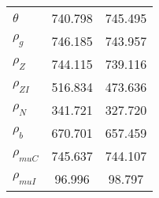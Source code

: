 \begin{center}
\begin{longtable}{lcc}
$ {\theta}             $	 & 	     740.798	 & 	     745.495 \\ 
$ {\rho_g}             $	 & 	     746.185	 & 	     743.957 \\ 
$ {\rho_Z}             $	 & 	     744.115	 & 	     739.116 \\ 
$ {\rho_{ZI}}          $	 & 	     516.834	 & 	     473.636 \\ 
$ {\rho_N}             $	 & 	     341.721	 & 	     327.720 \\ 
$ {\rho_b}             $	 & 	     670.701	 & 	     657.459 \\ 
$ {\rho_{muC}}         $	 & 	     745.637	 & 	     744.107 \\ 
$ {\rho_{muI}}         $	 & 	      96.996	 & 	      98.797 \\ 
\end{longtable}
 \end{center}
